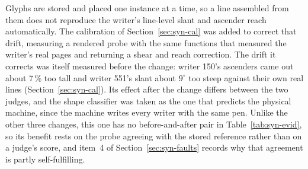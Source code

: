 Glyphs are stored and placed one instance at a time, so a line assembled from them does not reproduce the writer's line-level slant and ascender reach automatically. The calibration of Section~\ref{sec:syn-cal} was added to correct that drift, measuring a rendered probe with the same functions that measured the writer's real pages and returning a shear and reach correction. The drift it corrects was itself measured before the change: writer 150's ascenders came out about 7\,\% too tall and writer 551's slant about $9^\circ$ too steep against their own real lines (Section~\ref{sec:syn-cal}).
Its effect after the change differs between the two judges, and the shape classifier was taken as the one that predicts the physical machine, since the machine writes every writer with the same pen.
Unlike the other three changes, this one has no before-and-after pair in Table~\ref{tab:syn-evid}, so its benefit rests on the probe agreeing with the stored reference rather than on a judge's score, and item~4 of Section~\ref{sec:syn-faults} records why that agreement is partly self-fulfilling.

